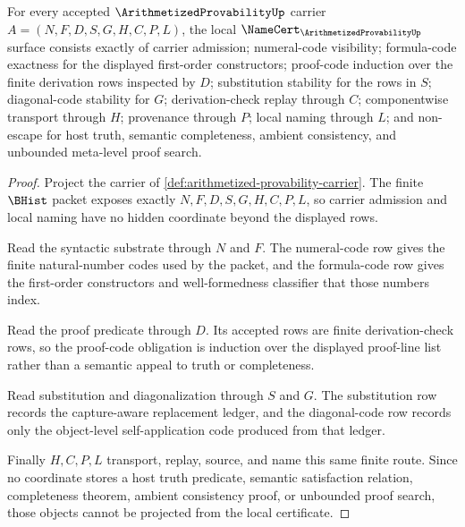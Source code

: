 \begin{theorem}
\label{thm:arithmetized-provability-namecert-obligations}
For every accepted $\ArithmetizedProvabilityUp$ carrier $A=(N,F,D,S,G,H,C,P,L)$, the local $\NameCert_{\ArithmetizedProvabilityUp}$ surface consists exactly of carrier admission; numeral-code visibility; formula-code exactness for the displayed first-order constructors; proof-code induction over the finite derivation rows inspected by $D$; substitution stability for the rows in $S$; diagonal-code stability for $G$; derivation-check replay through $C$; componentwise transport through $H$; provenance through $P$; local naming through $L$; and non-escape for host truth, semantic completeness, ambient consistency, and unbounded meta-level proof search.
\end{theorem}
\begin{proof}
Project the carrier of \autoref{def:arithmetized-provability-carrier}. The finite $\BHist$ packet exposes exactly $N,F,D,S,G,H,C,P,L$, so carrier admission and local naming have no hidden coordinate beyond the displayed rows.

Read the syntactic substrate through $N$ and $F$. The numeral-code row gives the finite natural-number codes used by the packet, and the formula-code row gives the first-order constructors and well-formedness classifier that those numbers index.

Read the proof predicate through $D$. Its accepted rows are finite derivation-check rows, so the proof-code obligation is induction over the displayed proof-line list rather than a semantic appeal to truth or completeness.

Read substitution and diagonalization through $S$ and $G$. The substitution row records the capture-aware replacement ledger, and the diagonal-code row records only the object-level self-application code produced from that ledger.

Finally $H,C,P,L$ transport, replay, source, and name this same finite route. Since no coordinate stores a host truth predicate, semantic satisfaction relation, completeness theorem, ambient consistency proof, or unbounded proof search, those objects cannot be projected from the local certificate.
\end{proof}

